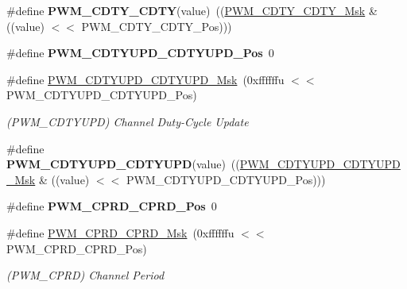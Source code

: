 \begin{DoxyCompactItemize}
\#define {\bfseries P\+W\+M\+\_\+\+C\+D\+T\+Y\+\_\+\+C\+D\+TY}(value)~((\mbox{\hyperlink{group__SAMV71__PWM_gaed15d16af3f59ccddcf4f629ea3c5852}{P\+W\+M\+\_\+\+C\+D\+T\+Y\+\_\+\+C\+D\+T\+Y\+\_\+\+Msk}} \& ((value) $<$$<$ P\+W\+M\+\_\+\+C\+D\+T\+Y\+\_\+\+C\+D\+T\+Y\+\_\+\+Pos)))
\item 
\mbox{\label{group__SAMV71__PWM_gac8ebfb063219cd157b8360721811c4b2}} 
\#define {\bfseries P\+W\+M\+\_\+\+C\+D\+T\+Y\+U\+P\+D\+\_\+\+C\+D\+T\+Y\+U\+P\+D\+\_\+\+Pos}~0
\item 
\mbox{\label{group__SAMV71__PWM_ga4744918a2d9e85d39bfc066b0d9a6e3c}} 
\#define \mbox{\hyperlink{group__SAMV71__PWM_ga4744918a2d9e85d39bfc066b0d9a6e3c}{P\+W\+M\+\_\+\+C\+D\+T\+Y\+U\+P\+D\+\_\+\+C\+D\+T\+Y\+U\+P\+D\+\_\+\+Msk}}~(0xffffffu $<$$<$ P\+W\+M\+\_\+\+C\+D\+T\+Y\+U\+P\+D\+\_\+\+C\+D\+T\+Y\+U\+P\+D\+\_\+\+Pos)
\begin{DoxyCompactList}\small\item\em (P\+W\+M\+\_\+\+C\+D\+T\+Y\+U\+PD) Channel Duty-\/\+Cycle Update \end{DoxyCompactList}\item 
\mbox{\label{group__SAMV71__PWM_ga69460f40bbe07d9e2d8112525c0f6eb5}} 
\#define {\bfseries P\+W\+M\+\_\+\+C\+D\+T\+Y\+U\+P\+D\+\_\+\+C\+D\+T\+Y\+U\+PD}(value)~((\mbox{\hyperlink{group__SAMV71__PWM_ga4744918a2d9e85d39bfc066b0d9a6e3c}{P\+W\+M\+\_\+\+C\+D\+T\+Y\+U\+P\+D\+\_\+\+C\+D\+T\+Y\+U\+P\+D\+\_\+\+Msk}} \& ((value) $<$$<$ P\+W\+M\+\_\+\+C\+D\+T\+Y\+U\+P\+D\+\_\+\+C\+D\+T\+Y\+U\+P\+D\+\_\+\+Pos)))
\item 
\mbox{\label{group__SAMV71__PWM_ga15e63c47355a0e697cf879301bdcfe97}} 
\#define {\bfseries P\+W\+M\+\_\+\+C\+P\+R\+D\+\_\+\+C\+P\+R\+D\+\_\+\+Pos}~0
\item 
\mbox{\label{group__SAMV71__PWM_gae5af6b617a5d5e4da51ade21024e340d}} 
\#define \mbox{\hyperlink{group__SAMV71__PWM_gae5af6b617a5d5e4da51ade21024e340d}{P\+W\+M\+\_\+\+C\+P\+R\+D\+\_\+\+C\+P\+R\+D\+\_\+\+Msk}}~(0xffffffu $<$$<$ P\+W\+M\+\_\+\+C\+P\+R\+D\+\_\+\+C\+P\+R\+D\+\_\+\+Pos)
\begin{DoxyCompactList}\small\item\em (P\+W\+M\+\_\+\+C\+P\+RD) Channel Period \end{DoxyCompactList}\item 

\end{DoxyCompactItemize}
